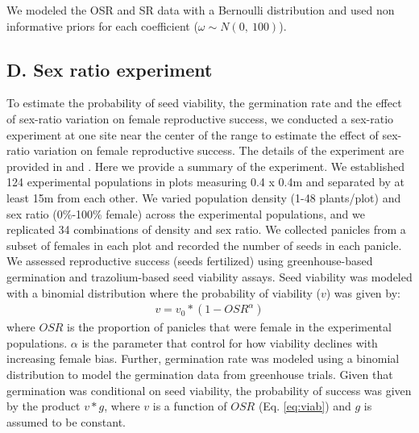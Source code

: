 \documentclass[9pt,twoside,lineno]{pnas-new}
\newcommand{\revise}[1]{{\color{Mahogany}{#1}}}
\begin{document}
We modeled the OSR and SR data with a Bernoulli distribution and used non informative priors for each coefficient ($\omega \sim N(0,\ 100)$). 

\subsection*{D. Sex ratio experiment} 
To estimate the probability of seed viability,  the germination rate and the effect of sex-ratio variation on female reproductive success, we conducted a sex-ratio experiment at one site near the center of the range to estimate the effect of sex-ratio variation on female reproductive success.
The details of the experiment are provided in \cite{compagnoni2017can} and \cite{miller2022two}.
Here we provide a summary of the experiment.
We established 124 experimental populations in plots measuring 0.4 x 0.4m and separated by at least 15m from each other.
We varied population density (1-48 plants/plot) and sex ratio (0\%-100\% female) across the experimental populations, and we replicated 34 combinations of density and sex ratio.
We collected panicles from a subset of females in each plot and recorded the number of seeds in each panicle.
We assessed reproductive success (seeds fertilized) using greenhouse-based germination and trazolium-based seed viability assays.
Seed viability was modeled \revise {to propagate the uncertainty in our estimates}  with a binomial distribution where the probability of viability ($v$) was given by:
\begin{align}\label{eq:viab}
	v = v_{0} * (1 - OSR^{\alpha})
\end{align}
\noindent where $OSR$ is the proportion of panicles that were female in the experimental populations.
$\alpha$ is the parameter that control for how viability declines with increasing female bias.
Further, germination rate was modeled using a binomial distribution to model the germination data from greenhouse trials.
Given that germination was conditional on seed viability, the probability of success was given by the product $v*g$, where $v$ is a function of $OSR$ (Eq. \ref{eq:viab}) and $g$ is assumed to be constant.

\clearpage
\end{document}
